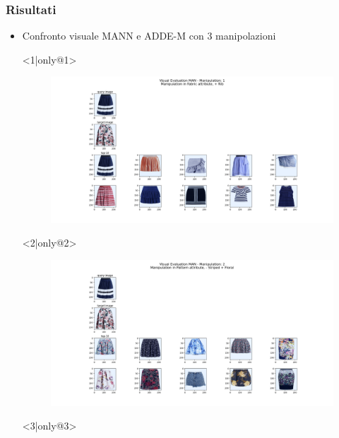 \documentclass{beamer}
\begin{document}
\begin{frame}
\frametitle{Risultati}
\begin{itemize} 
\item Confronto visuale MANN e ADDE-M con $3$ manipolazioni
\item[] <1|only@1> 
\hspace{-20px}
\begin{figure}[!h]
 			\begin{center}
 			\hspace{-80px}
 			\includegraphics[scale=0.28]{"Immagini/3.1.png"}
 			\end{center}
\end{figure}
\item[] <2|only@2>
\hspace{-20px}
\begin{figure}[!h]
 			\begin{center}
 			\hspace{-80px}
 			\includegraphics[scale=0.28]{"Immagini/3.2.png"}
 			\end{center}
\end{figure}
\item[] <3|only@3> 
\hspace{-20px}
\begin{figure}[!h]

\end{figure}
\end{itemize}
\end{frame}
\end{document}
